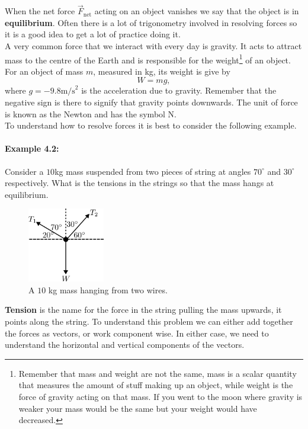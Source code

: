 \documentclass[a4paper,12pt]{book}
\begin{document}
When the net force $\vec{F}_{\text{net}}$ acting on an object vanishes we say that the object is in \textbf{equilibrium}. Often there is a lot of trigonometry involved in resolving forces so it is a good idea to get a lot of practice doing it.\\

A very common force that we interact with every day is gravity. It acts to attract mass to the centre of the Earth and is responsible for the weight\footnote{Remember that mass and weight are not the same, mass is a scalar quantity that measures the amount of stuff making up an object, while weight is the force of gravity acting on that mass. If you went to the moon where gravity is weaker your mass would be the same but your weight would have decreased.} of an object. For an object of mass $m$, measured in kg, its weight is give by
\begin{equation}
W=mg,
\end{equation}
where $g=-9.8\text{m/s}^{2}$ is the acceleration due to gravity. Remember that the negative sign is there to signify that gravity points downwards. The unit of force is known as the Newton and has the symbol N. \\


To understand how to resolve forces it is best to consider the following example.
\paragraph{Example 4.2:} Consider a $10$kg mass suspended from two pieces of string at angles $70^{\circ}$ and $30^{\circ}$ respectively.  What is the tensions in the strings so that the mass hangs at equilibrium.
\begin{figure}[ht]
    \centering
    \includegraphics[width=0.3\textwidth]{figures/hanging_mass.png}
    \caption{A $10$ kg mass hanging from two wires.}
    \label{fig: hanging mass}
\end{figure}
\textbf{Tension} is the name for the force in the string pulling the mass upwards, it points along the string.  To understand this problem we can either add together the forces as vectors, or work component wise. In either case, we need to understand the horizontal and vertical components of the vectors.\\
\end{document}

